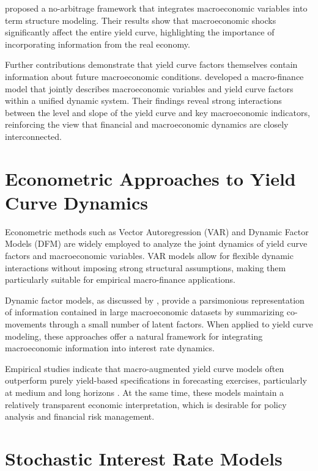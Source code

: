 \textcite{ang_piazzesi_2003} proposed a no-arbitrage framework that integrates
macroeconomic variables into term structure modeling. Their results show that macroeconomic
shocks significantly affect the entire yield curve, highlighting the importance of incorporating
information from the real economy.

Further contributions demonstrate that yield curve factors themselves contain information
about future macroeconomic conditions. \textcite{diebold_rudebusch_aruoba_2006}
developed a macro-finance model that jointly describes macroeconomic variables and yield
curve factors within a unified dynamic system. Their findings reveal strong interactions
between the level and slope of the yield curve and key macroeconomic indicators, reinforcing
the view that financial and macroeconomic dynamics are closely interconnected.

\section{Econometric Approaches to Yield Curve Dynamics}

Econometric methods such as Vector Autoregression (VAR) and Dynamic Factor Models (DFM)
are widely employed to analyze the joint dynamics of yield curve factors and macroeconomic
variables. VAR models allow for flexible dynamic interactions without imposing strong
structural assumptions, making them particularly suitable for empirical macro-finance
applications.

Dynamic factor models, as discussed by \textcite{stock_watson_2002}, provide a parsimonious
representation of information contained in large macroeconomic datasets by summarizing
co-movements through a small number of latent factors. When applied to yield curve modeling,
these approaches offer a natural framework for integrating macroeconomic information into
interest rate dynamics.

Empirical studies indicate that macro-augmented yield curve models often outperform
purely yield-based specifications in forecasting exercises, particularly at medium and long
horizons \parencite{koop_korobilis_2010}. At the same time, these models maintain a relatively
transparent economic interpretation, which is desirable for policy analysis and financial risk
management.

\section{Stochastic Interest Rate Models}

